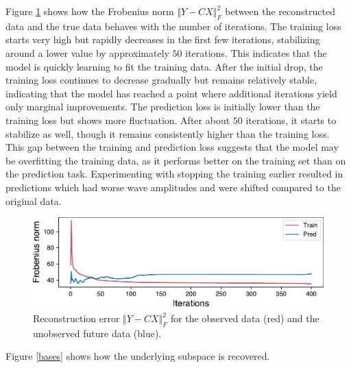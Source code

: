 \documentclass{mldsmsc}
\begin{document}
\noindent Figure \ref{loss} shows how the Frobenius norm $\Vert Y - CX \Vert^2_F$ between the reconstructed data and the true data behaves with the number of iterations. The training loss starts very high but rapidly decreases in the first few iterations, stabilizing around a lower value by approximately $50$ iterations. This indicates that the model is quickly learning to fit the training data. After the initial drop, the training loss continues to decrease gradually but remains relatively stable, indicating that the model has reached a point where additional iterations yield only marginal improvements. The prediction loss is initially lower than the training loss but shows more fluctuation. After about $50$ iterations, it starts to stabilize as well, though it remains consistently higher than the training loss. This gap between the training and prediction loss suggests that the model may be overfitting the training data, as it performs better on the training set than on the prediction task. Experimenting with stopping the training earlier resulted in predictions which had worse wave amplitudes and were shifted compared to the original data.

\begin{figure}[h]
\begin{center}
\includegraphics[scale=1]{images/forecast/periodic_cost.pdf}
\caption{Reconstruction error $\Vert Y - CX \Vert^2_F$ for the observed data (red) and the unobserved future data (blue).}
\label{loss}
\end{center}
\end{figure}

\noindent Figure \ref{bases} shows how the underlying subspace is recovered.
\end{document}
